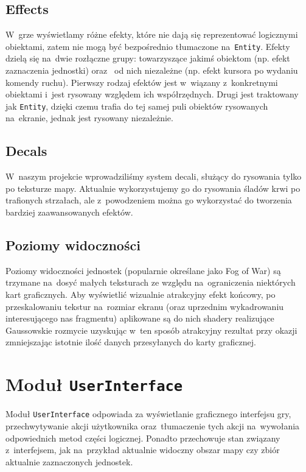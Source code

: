 \documentclass[licencjacka]{pracamgr}
\begin{document}
    \subsection{Effects}
      W~grze wyświetlamy różne efekty, które nie dają się reprezentować logicznymi obiektami, zatem nie mogą być bezpośrednio tłumaczone
      na~\texttt{Entity}. Efekty dzielą się na~dwie rozłączne grupy: towarzyszące jakimś obiektom (np. efekt zaznaczenia jednostki) oraz~
      od nich niezależne (np. efekt kursora po wydaniu komendy ruchu). Pierwszy rodzaj efektów jest w~wiązany z~konkretnymi obiektami i~jest
      rysowany względem ich współrzędnych. Drugi jest traktowany jak \texttt{Entity}, dzięki czemu trafia do tej samej puli obiektów rysowanych
      na~ekranie, jednak jest rysowany niezależnie.

    \subsection{Decals}
      W~naszym projekcie wprowadziliśmy system decali, służący do rysowania tylko po teksturze mapy. Aktualnie wykorzystujemy go do
      rysowania śladów krwi po trafionych strzałach, ale z~powodzeniem można go wykorzystać do tworzenia bardziej zaawansowanych efektów.

    \subsection{Poziomy widoczności}
      Poziomy widoczności jednostek (popularnie określane jako Fog of War) są trzymane na~dosyć małych teksturach ze względu na~ograniczenia
      niektórych kart graficznych. Aby wyświetlić wizualnie atrakcyjny efekt końcowy, po przeskalowaniu tekstur na~rozmiar ekranu
      (oraz uprzednim wykadrowaniu interesującego nas fragmentu) aplikowane są do nich shadery realizujące Gaussowskie rozmycie\cite{GB}
      uzyskując w~ten sposób atrakcyjny rezultat przy okazji zmniejszając istotnie ilość danych przesyłanych do karty graficznej.

  \section{Moduł \texttt{UserInterface}}
    Moduł \texttt{UserInterface} odpowiada za wyświetlanie graficznego interfejsu gry, przechwytywanie akcji użytkownika
    oraz~tłumaczenie tych akcji na~wywołania odpowiednich metod części logicznej. Ponadto przechowuje stan związany
    z~interfejsem, jak na~przykład aktualnie widoczny obszar mapy czy zbiór aktualnie zaznaczonych jednostek.
\end{document}

